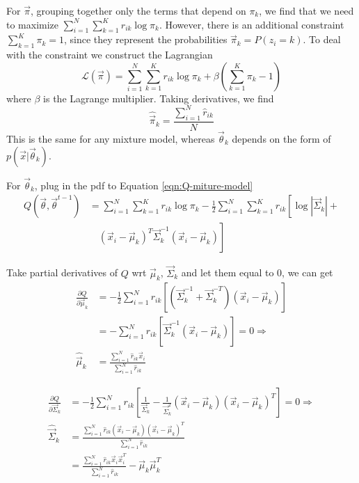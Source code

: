 For $\vec{\pi}$, grouping together only the terms that depend on $\pi_k$, we find that we need to maximize $\sum\limits_{i=1}^N{\sum\limits_{k=1}^K{r_{ik}\log \pi_k}}$. However, there is an additional constraint $\sum\limits_{k=1}^K{\pi_k}=1$, since they represent the probabilities $\vec{\pi}_k=P(z_i=k)$. To deal with the constraint we construct the Lagrangian
\begin{equation}
\mathcal{L}(\vec{\pi})=\sum\limits_{i=1}^N{\sum\limits_{k=1}^K{r_{ik}\log \pi_k}}+\beta\left(\sum\limits_{k=1}^K{\pi_k}-1\right) \nonumber
\end{equation}
where $\beta$ is the Lagrange multiplier. Taking derivatives, we find
\begin{equation}
\hat{\vec{\pi}}_k=\frac{\sum\limits_{i=1}^N \hat{r}_{ik}}{N}
\end{equation}
This is the same for any mixture model, whereas $\vec{\theta}_k$ depends on the form of $p(\vec{x}|\vec{\theta}_k)$.

For $\vec{\theta}_k$, plug in the pdf to Equation \ref{eqn:Q-miture-model}
\begin{equation*}\begin{split}
Q(\vec{\theta}, \vec{\theta}^{t-1}) & =\sum\limits_{i=1}^N{\sum\limits_{k=1}^K{r_{ik}\log \pi_k}}-\frac{1}{2}\sum\limits_{i=1}^N  \sum\limits_{k=1}^K  r_{ik}\left[\log |\vec{\Sigma}_k| + \right. \\
 & \quad \left. (\vec{x}_i-\vec{\mu}_k)^T\vec{\Sigma}_k^{-1}(\vec{x}_i-\vec{\mu}_k)\right]
\end{split}\end{equation*}

Take partial derivatives of $Q$ wrt $\vec{\mu}_k$, $\vec{\Sigma}_k$ and let them equal to 0, we can get
\begin{align}
\frac{\partial Q}{\partial \vec{\mu}_k} & = -\frac{1}{2}\sum\limits_{i=1}^N{r_{ik}\left[(\vec{\Sigma}_k^{-1}+\vec{\Sigma}_k^{-T})(\vec{x}_i-\vec{\mu}_k)\right]} \nonumber \\
    &  =-\sum\limits_{i=1}^N{r_{ik}\left[\vec{\Sigma}_k^{-1}(\vec{x}_i-\vec{\mu}_k)\right]}=0 \Rightarrow \nonumber \\
\hat{\vec{\mu}}_k & = \frac{\sum_{i=1}^N \hat{r}_{ik}\vec{x}_i}{\sum_{i=1}^N \hat{r}_{ik}}
\end{align}

\begin{align}
\frac{\partial Q}{\partial \vec{\Sigma}_k} & = -\frac{1}{2}\sum\limits_{i=1}^N{r_{ik}\left[\frac{1}{\vec{\Sigma}_k}-\frac{1}{\vec{\Sigma}_k^2}(\vec{x}_i-\vec{\mu}_k)(\vec{x}_i-\vec{\mu}_k)^T\right]}=0 \Rightarrow \nonumber \\
\hat{\vec{\Sigma}}_k & = \frac{\sum_{i=1}^N \hat{r}_{ik}(\vec{x}_i-\vec{\mu}_k)(\vec{x}_i-\vec{\mu}_k)^T}{\sum_{i=1}^N \hat{r}_{ik}} \\
 & =\frac{\sum_{i=1}^N \hat{r}_{ik}\vec{x}_i\vec{x}_i^T}{\sum_{i=1}^N \hat{r}_{ik}}-\vec{\mu}_k\vec{\mu}_k^T
\end{align}



